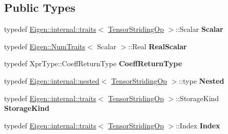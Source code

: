 \subsection*{Public Types}
\begin{DoxyCompactItemize}
\item 
\mbox{\label{class_eigen_1_1_tensor_striding_op_a7597b239cf2e9d030ee205806c545edb}} 
typedef \hyperlink{struct_eigen_1_1internal_1_1traits}{Eigen\+::internal\+::traits}$<$ \hyperlink{class_eigen_1_1_tensor_striding_op}{Tensor\+Striding\+Op} $>$\+::Scalar {\bfseries Scalar}
\item 
\mbox{\label{class_eigen_1_1_tensor_striding_op_af1cfc253058507847f617fc701e04666}} 
typedef \hyperlink{group___core___module_struct_eigen_1_1_num_traits}{Eigen\+::\+Num\+Traits}$<$ Scalar $>$\+::Real {\bfseries Real\+Scalar}
\item 
\mbox{\label{class_eigen_1_1_tensor_striding_op_a1a28df70ed45e327cac1bd03226d8607}} 
typedef Xpr\+Type\+::\+Coeff\+Return\+Type {\bfseries Coeff\+Return\+Type}
\item 
\mbox{\label{class_eigen_1_1_tensor_striding_op_ab04153b430d9acdd41728afcdc0dd384}} 
typedef \hyperlink{struct_eigen_1_1internal_1_1nested}{Eigen\+::internal\+::nested}$<$ \hyperlink{class_eigen_1_1_tensor_striding_op}{Tensor\+Striding\+Op} $>$\+::type {\bfseries Nested}
\item 
\mbox{\label{class_eigen_1_1_tensor_striding_op_a4c11d2154aaa27c8deff74966ae254a1}} 
typedef \hyperlink{struct_eigen_1_1internal_1_1traits}{Eigen\+::internal\+::traits}$<$ \hyperlink{class_eigen_1_1_tensor_striding_op}{Tensor\+Striding\+Op} $>$\+::Storage\+Kind {\bfseries Storage\+Kind}
\item 
\mbox{\label{class_eigen_1_1_tensor_striding_op_a39ec4df37d2ca827a7cc11133eb9b007}} 
typedef \hyperlink{struct_eigen_1_1internal_1_1traits}{Eigen\+::internal\+::traits}$<$ \hyperlink{class_eigen_1_1_tensor_striding_op}{Tensor\+Striding\+Op} $>$\+::Index {\bfseries Index}
\item 
\mbox{\label{class_eigen_1_1_tensor_striding_op_a7597b239cf2e9d030ee205806c545edb}} 

\end{DoxyCompactItemize}
